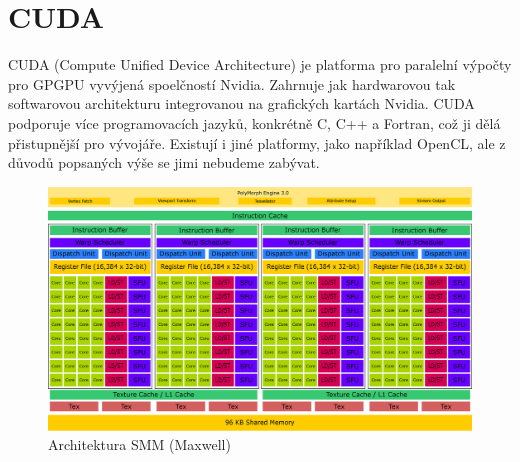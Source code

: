 \section{CUDA}
CUDA (Compute Unified Device Architecture) je platforma pro paralelní výpočty pro GPGPU vyvýjená spoelčností Nvidia. Zahrnuje jak hardwarovou tak softwarovou architekturu integrovanou na grafických kartách Nvidia. CUDA podporuje více programovacích jazyků, konkrétně C, C++ a Fortran, což ji dělá přistupnější pro vývojáře. Existují i jiné platformy, jako například OpenCL, ale z důvodů popsaných výše se jimi nebudeme zabývat.\\

\begin{figure}[h]
\centering
  \includegraphics[width=1\linewidth]{img/SMMArchitecture.eps}
  \caption{Architektura SMM (Maxwell)}
  \label{fig:smmarchitecture}
\end{figure}

